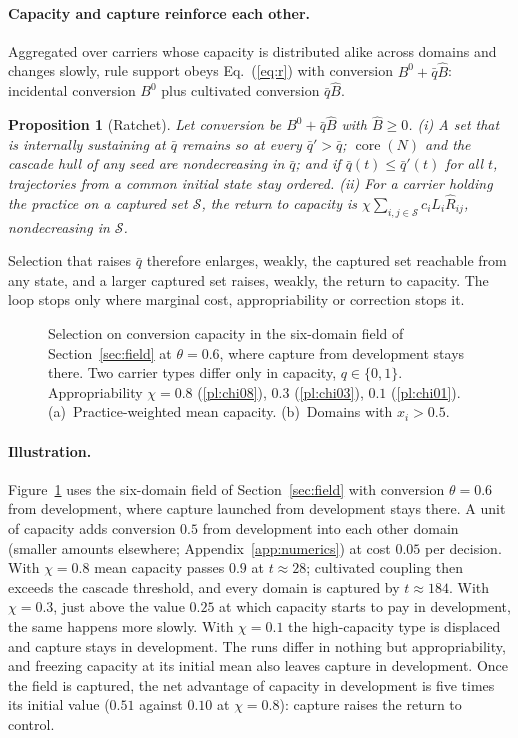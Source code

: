 \documentclass[letterpaper]{article} %
\newtheorem{proposition}{Proposition}
\theoremstyle{definition}
\newcommand{\core}{\operatorname{core}}
\newcommand{\cS}{\mathcal{S}}
\begin{document}
\paragraph{Capacity and capture reinforce each other.} Aggregated over carriers whose capacity is distributed alike across domains and changes slowly, rule support obeys Eq.~(\ref{eq:r}) with conversion $B^0+\bar q\hat B$: incidental conversion $B^0$ plus cultivated conversion $\bar q\hat B$.

\begin{proposition}[Ratchet]\label{prop:ratchet}
Let conversion be $B^0+\bar q\hat B$ with $\hat B\ge0$. (i) A set that is internally sustaining at $\bar q$ remains so at every $\bar q'>\bar q$; $\core(N)$ and the cascade hull of any seed are nondecreasing in $\bar q$; and if $\bar q(t)\le\bar q'(t)$ for all $t$, trajectories from a common initial state stay ordered. (ii) For a carrier holding the practice on a captured set $\cS$, the return to capacity is $\chi\sum_{i,j\in\cS}c_iL_i\hat R_{ij}$, nondecreasing in $\cS$.
\end{proposition}

Selection that raises $\bar q$ therefore enlarges, weakly, the captured set reachable from any state, and a larger captured set raises, weakly, the return to capacity. The loop stops only where marginal cost, appropriability or correction stops it.

\begin{figure}[t]
\centering

\caption{Selection on conversion capacity in the six-domain field of Section~\ref{sec:field} at $\theta=0.6$, where capture from development stays there. Two carrier types differ only in capacity, $q\in\{0,1\}$. Appropriability $\chi=0.8$ (\ref{pl:chi08}), $0.3$ (\ref{pl:chi03}), $0.1$ (\ref{pl:chi01}). (a)~Practice-weighted mean capacity. (b)~Domains with $x_i>0.5$.}
\label{fig:capacity}
\end{figure}

\paragraph{Illustration.} Figure~\ref{fig:capacity} uses the six-domain field of Section~\ref{sec:field} with conversion $\theta=0.6$ from development, where capture launched from development stays there. A unit of capacity adds conversion $0.5$ from development into each other domain (smaller amounts elsewhere; Appendix~\ref{app:numerics}) at cost $0.05$ per decision. With $\chi=0.8$ mean capacity passes $0.9$ at $t\approx28$; cultivated coupling then exceeds the cascade threshold, and every domain is captured by $t\approx184$. With $\chi=0.3$, just above the value $0.25$ at which capacity starts to pay in development, the same happens more slowly. With $\chi=0.1$ the high-capacity type is displaced and capture stays in development. The runs differ in nothing but appropriability, and freezing capacity at its initial mean also leaves capture in development. Once the field is captured, the net advantage of capacity in development is five times its initial value ($0.51$ against $0.10$ at $\chi=0.8$): capture raises the return to control.
\end{document}
